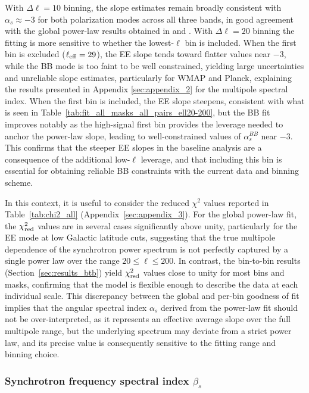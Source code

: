 With $\Delta\ell = 10$ binning, the slope estimates remain broadly consistent with $\alpha_s \approx -3$ for both polarization modes across all three bands, in good agreement with the global power-law results obtained in \cite{QUIJOTE_IV} and \cite{Martire_2022}. With $\Delta\ell = 20$ binning the fitting is more sensitive to whether the lowest-$\ell$ bin is included. When the first bin is excluded ($\ell_{\rm eff} = 29$), the EE slope tends toward flatter values near $-3$, while the BB mode is too faint to be well constrained, yielding large uncertainties and unreliable slope estimates, particularly for WMAP and Planck, explaining the results presented in Appendix \ref{sec:appendix_2} for the multipole spectral index. When the first bin is included, the EE slope steepens, consistent with what is seen in Table~\ref{tab:fit_all_masks_all_pairs_ell20-200}, but the BB fit improves notably as the high-signal first bin provides the leverage needed to anchor the power-law slope, leading to well-constrained values of $\alpha_s^{BB}$ near $-3$. This confirms that the steeper EE slopes in the baseline analysis are a consequence of the additional low-$\ell$ leverage, and that including this bin is essential for obtaining reliable BB constraints with the current data and binning scheme.

In this context, it is useful to consider the reduced $\chi^2$ values reported in Table~\ref{tab:chi2_all} (Appendix~\ref{sec:appendix_3}). For the global power-law fit, the $\chi^2_{\rm red}$ values are in several cases significantly above unity, particularly for the EE mode at low Galactic latitude cuts, suggesting that the true multipole dependence of the synchrotron power spectrum is not perfectly captured by a single power law over the range $20 \leq \ell \leq 200$. In contrast, the bin-to-bin results (Section~\ref{sec:results_btb}) yield $\chi^2_{\rm red}$ values close to unity for most bins and masks, confirming that the model is flexible enough to describe the data at each individual scale. This discrepancy between the global and per-bin goodness of fit implies that the angular spectral index $\alpha_s$ derived from the power-law fit should not be over-interpreted, as it represents an effective average slope over the full multipole range, but the underlying spectrum may deviate from a strict power law, and its precise value is consequently sensitive to the fitting range and binning choice.

\subsubsection{Synchrotron frequency spectral index $\beta_s$}
\label{sec:synch_bet_pl}

